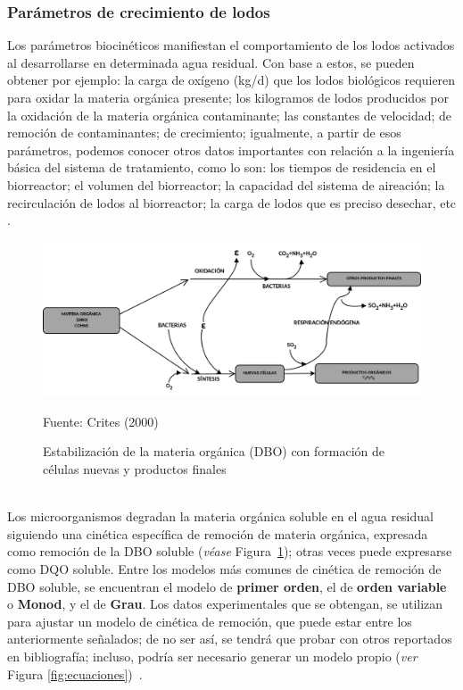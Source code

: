 \subsubsection*{Parámetros de crecimiento de lodos}
Los parámetros biocinéticos manifiestan el comportamiento de los lodos activados al desarrollarse en determinada agua residual. Con base a estos, se pueden obtener por ejemplo: la carga de oxígeno (kg/d) que los lodos biológicos requieren para oxidar la materia orgánica presente; los kilogramos de lodos producidos por la oxidación de la materia orgánica contaminante; las constantes de velocidad; de remoción de contaminantes; de crecimiento; igualmente, a partir de esos parámetros, podemos conocer otros datos importantes con relación a la ingeniería básica del sistema de tratamiento, como lo son: los tiempos de residencia en el biorreactor; el volumen del biorreactor; la capacidad del sistema de aireación; la recirculación de lodos al biorreactor; la carga de lodos que es preciso desechar, etc \emph{\citep{martinez2005}}.
	\begin{figure}[!h]
		\begin{center}
		\includegraphics[scale=0.25]{Estabilizacion_mat_org.png}
		\caption{Estabilización de la materia orgánica (DBO) con formación de células nuevas y productos finales}
		\small{Fuente: Crites (2000)}
		\label{fig:estabilizacion}
		\end{center}
	\end{figure}
\\Los microorganismos degradan la materia orgánica soluble en el agua residual siguiendo una cinética específica de remoción de materia orgánica, expresada como remoción de la DBO soluble (\emph{véase} Figura~\ref{fig:estabilizacion}); otras veces puede expresarse como DQO soluble. Entre los modelos más comunes de cinética de remoción de DBO soluble, se encuentran el modelo de \textbf{primer orden}, el de \textbf{orden variable} o \textbf{Monod}, y el de \textbf{Grau}. Los datos experimentales que se obtengan, se utilizan para ajustar un modelo de cinética de remoción, que puede estar entre los anteriormente señalados; de no ser así, se tendrá que probar con otros reportados en bibliografía; incluso, podría ser necesario generar un modelo propio (\emph{ver} Figura \ref{fig:ecuaciones})~\emph{\citep{martinez2005}}.
